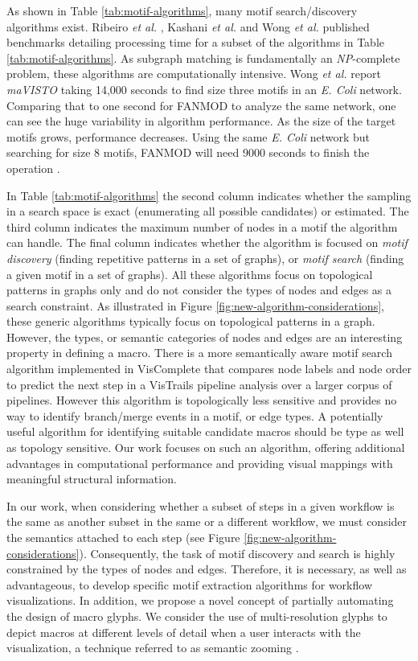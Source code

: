 As shown in Table \ref{tab:motif-algorithms}, many motif search/discovery algorithms exist. 
Ribeiro \emph{et al.} \cite{ribeiro10}, Kashani \emph{et al.} \cite{kashani09} and Wong \emph{et al.} \cite{Wong:2012} published benchmarks detailing processing time for a subset of the algorithms in Table \ref{tab:motif-algorithms}.
As subgraph matching is fundamentally an \emph{NP}-complete problem, these algorithms are computationally intensive.
Wong \emph{et al.} report \emph{maVISTO} taking 14,000 seconds to find size three motifs in an \emph{E. Coli} network.
Comparing that to one second for FANMOD to analyze the same network, one can see the huge variability in algorithm performance.
As the size of the target motifs grows, performance decreases.
Using the same \emph{E. Coli} network but searching for size 8 motifs, FANMOD will need 9000 seconds to finish the operation \cite{Wong:2012}.

In Table \ref{tab:motif-algorithms} the second column indicates whether the sampling in a search space is exact (enumerating all possible candidates) or estimated.
The third column indicates the maximum number of nodes in a motif the algorithm can handle.
The final column indicates whether the algorithm is focused on \emph{motif discovery} (finding repetitive patterns in a set of graphs), or \emph{motif search} (finding a given motif in a set of graphs). 
All these algorithms focus on topological patterns in graphs only and do not consider the types of nodes and edges as a search constraint. 
As illustrated in Figure \ref{fig:new-algorithm-considerations}, these generic algorithms typically focus on topological patterns in a graph.
However, the types, or semantic categories of nodes and edges are an interesting property in defining a macro.
There is a more semantically aware motif search algorithm implemented in VisComplete \cite{scheideggerquerying2007,koopviscomplete:2008} that compares node labels and node order to predict the next step in a VisTrails pipeline analysis over a larger corpus of pipelines. However this algorithm is topologically less sensitive and provides no way to identify branch/merge events in a motif, or edge types.
A potentially useful algorithm for identifying suitable candidate macros should be type as well as topology sensitive.
Our work focuses on such an algorithm, offering additional advantages in computational performance and providing visual mappings with meaningful structural information. 

In our work, when considering whether a subset of steps in a given workflow is the same as another subset in the same or a different workflow, we must consider the semantics attached to each step (see Figure \ref{fig:new-algorithm-considerations}).
Consequently, the task of motif discovery and search is highly constrained by the types of nodes and edges.
Therefore, it is necessary, as well as advantageous, to develop specific motif extraction algorithms for workflow visualizations.
In addition, we propose a novel concept of partially automating the design of macro glyphs.
We consider the use of multi-resolution glyphs to depict macros at different levels of detail when a user interacts with the visualization, a technique referred to as semantic zooming \cite{bedersonpad:1994,weaverbuilding2004}. 

